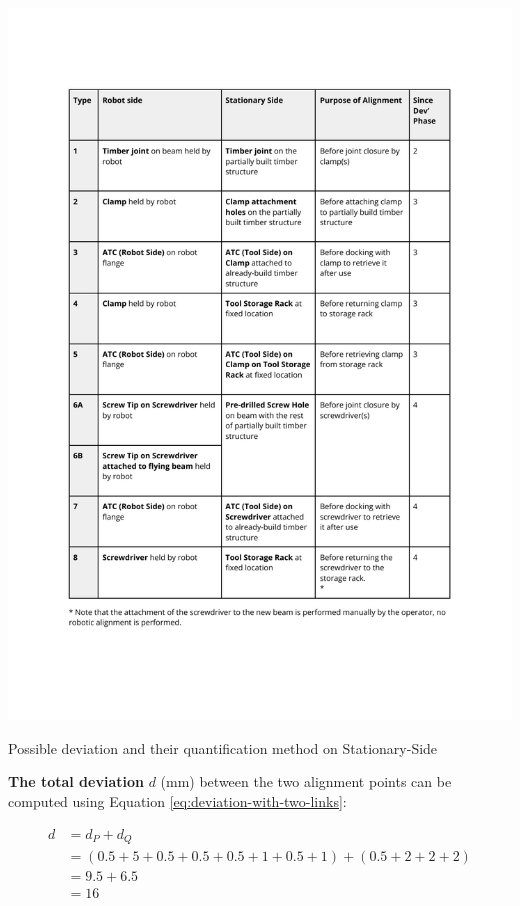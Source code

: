 \begin{table}
    \includegraphics[page=4, trim=25.4mm 165mm 25.4mm 33mm, clip, width=\textwidth]{tables/Tables in Chapter 9 to 11.pdf}
    \caption{Possible deviation and their quantification method on Stationary-Side}
    \label{table:deviation-stationary-side}
\end{table}

\textbf{The total deviation} $d$ (mm) between the two alignment points can be computed using Equation \ref{eq:deviation-with-two-links}:

\begin{align}
    d &= d_P + d_Q \nonumber\\
      &= (0.5 + 5 + 0.5 + 0.5 + 0.5 + 1 + 0.5 + 1) + (0.5 + 2 + 2 + 2)\nonumber\\
      &= 9.5 + 6.5\nonumber\\
      &= 16\nonumber
\end{align}

